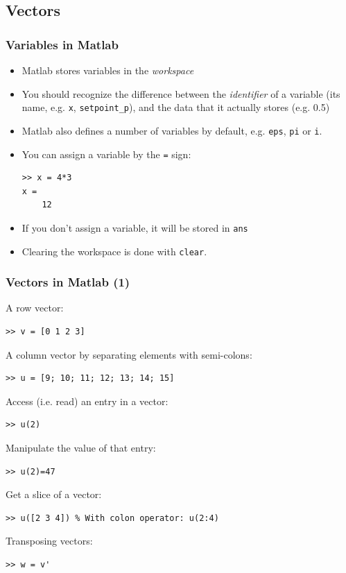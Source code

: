\documentclass[11pt,table,final,fleqn,xcolor={usenames,dvipsnames},unknownkeysallowed,handout]{beamer}
\begin{document}
\subsection*{Vectors}
\begin{frame}[fragile]
 \frametitle{Variables in Matlab}
  \begin{itemize}
   \item Matlab stores variables in the \emph{workspace}\pause
   \item You should recognize the difference between the \emph{identifier} of a variable (its name, e.g. \lstinline$x$, \lstinline$setpoint_p$), and the data that it actually stores (e.g. 0.5)\pause
   \item Matlab also defines a number of variables by default, e.g. \lstinline$eps$, \lstinline$pi$ or \lstinline$i$.\pause
   \item You can assign a variable by the \lstinline$=$ sign:
   \begin{lstlisting}
>> x = 4*3
x =
    12
   \end{lstlisting}\pause
   \item If you don't assign a variable, it will be stored in \lstinline$ans$
   \item Clearing the workspace is done with \lstinline$clear$.
 \end{itemize}
\end{frame}

\begin{frame}[fragile]
  \frametitle{Vectors in Matlab (1)}
  A row vector:
  \begin{lstlisting}
>> v = [0 1 2 3]
  \end{lstlisting}\pause
  A column vector by separating elements with semi-colons:
  \begin{lstlisting}
>> u = [9; 10; 11; 12; 13; 14; 15]
  \end{lstlisting}\pause
  Access (i.e. read) an entry in a vector:
  \begin{lstlisting}
>> u(2)
  \end{lstlisting}\pause
  Manipulate the value of that entry:
  \begin{lstlisting}
>> u(2)=47
  \end{lstlisting}\pause
  Get a slice of a vector:
  \begin{lstlisting}
>> u([2 3 4]) % With colon operator: u(2:4)
  \end{lstlisting}\pause
  Transposing vectors:
  \begin{lstlisting}
>> w = v'
  \end{lstlisting}
\end{frame}
\end{document}
